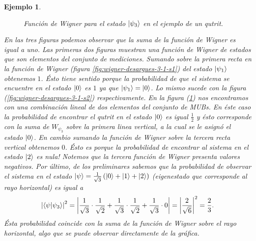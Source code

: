 \documentclass[a4paper,11pt]{report}
\newtheorem{example}{Ejemplo}
\begin{document}
\begin{example}
    \begin{figure}[ht]
      \centering
      \scalebox{0.7}{
        
      }
      \caption{Función de Wigner para el estado
        $\ket{\psi_3}$ en el ejemplo de un qutrit.}
      \label{fig:wigner-desargues-3-1-s3}
    \end{figure}

    En las tres figuras podemos observar que la suma de la
    función de Wigner es igual a uno. Las primeras dos
    figuras muestran una función de Wigner de estados que
    son elementos del conjunto de mediciones. Sumando sobre
    la primera recta en la función de Wigner (figura
    \ref{fig:wigner-desargues-3-1-s1}) del estado
    $\ket{\psi_1}$ obtenemos $1$. Ésto tiene sentido porque
    la probabilidad de que el sistema se encuentre en el
    estado $\ket 0$ es $1$ ya que $\ket{\psi_1} = \ket 0$.
    Lo mismo sucede con la figura
    (\ref{fig:wigner-desargues-3-1-s2}) respectivamente. En
    la figura (\ref{fig:wigner-desargues-3-1-s3}) nos
    encontramos con una combinación lineal de dos elementos
    del conjunto de MUBs. En éste caso la probabilidad de
    encontrar el qutrit en el estado $\ket 0$ es igual
    $\frac{1}{2}$ y ésto corresponde con la suma de
    $W_{\psi_3}$ sobre la primera linea vertical, a la cual
    se le asignó el estado $\ket 0$. En cambio sumando la
    función de Wigner sobre la tercera recta vertical
    obtenemos $0$. Ésto es porque la probabilidad de
    encontrar al sistema en el estado $\ket 2$ es nula!
    Notemos que la tercera función de Wigner presenta
    valores negativos. Por último, de los preliminares
    sabemos que la probabilidad de
    observar el sistema en el estado $\ket \psi =
    \frac{1}{\sqrt{3}}\left( \ket 0 + \ket 1 + \ket 2
    \right)$ (eigenestado que corresponde al rayo
    horizontal) es igual a
    \[
      \left|\braket{\psi|\psi_3}\right|^2
      = \left|
      \frac{1}{\sqrt{3}} \cdot \frac{1}{\sqrt{2}} +
      \frac{1}{\sqrt{3}} \cdot \frac{1}{\sqrt{2}} +
      \frac{1}{\sqrt{3}} \cdot 0
      \right|
      = \left|\frac{2}{\sqrt{6}}\right|^2
      = \frac{2}{3}.
    \] 
    Ésta probabilidad coincide con la suma de la función de
    Wigner sobre el rayo horizontal, algo que se puede
    observar directamente de la gráfica.
  \end{example}
\end{document}

